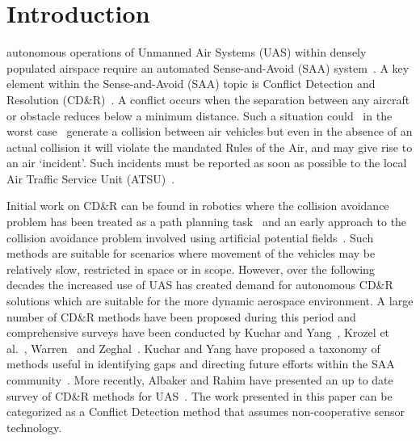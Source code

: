 \documentclass[journal]{IEEEtran}
\begin{document}
\section{Introduction}
 autonomous operations of Unmanned Air Systems (UAS) within densely populated airspace require an automated Sense-and-Avoid (SAA) system~\cite{angelov2012sense}. A key element within the Sense-and-Avoid (SAA) topic is Conflict Detection and Resolution (CD\&R)~\cite{angelov2012sense}. A conflict occurs when the separation between any aircraft or obstacle reduces below a minimum distance. Such a situation could~ in the worst case~ generate a collision between air vehicles but even in the absence of an actual collision it will violate the mandated Rules of the Air, and may give rise to an air ‘incident’. Such incidents must be reported as soon as possible to the local Air Traffic Service Unit (ATSU)~\cite{ICAOannex13}. 

Initial work on CD\&R can be found in robotics where the collision avoidance problem has been treated as a path planning task~\cite{moravec1980obstacle} and an early approach to the collision avoidance problem involved using artificial potential fields~\cite{khatib1986real}. Such methods are suitable for scenarios where movement of the vehicles may be relatively slow, restricted in space or in scope. However, over the following decades the increased use of UAS has created demand for autonomous CD\&R solutions which are suitable for the more dynamic aerospace environment. A large number of CD\&R methods have been proposed during this period and comprehensive surveys have been conducted by Kuchar and Yang~\cite{kuchar2000review}, Krozel et al.~\cite{krozel1997conflict}, Warren~\cite{warren1997medium} and Zeghal~\cite{zeghal1998review}. Kuchar and Yang have proposed a taxonomy of methods useful in identifying gaps and directing future efforts within the SAA community~\cite{kuchar2000review}. More recently, Albaker and Rahim have presented an up to date survey of CD\&R methods for UAS~\cite{albaker2009survey}. The work presented in this paper can be categorized as a Conflict Detection method that assumes non-cooperative sensor technology.
\end{document}
